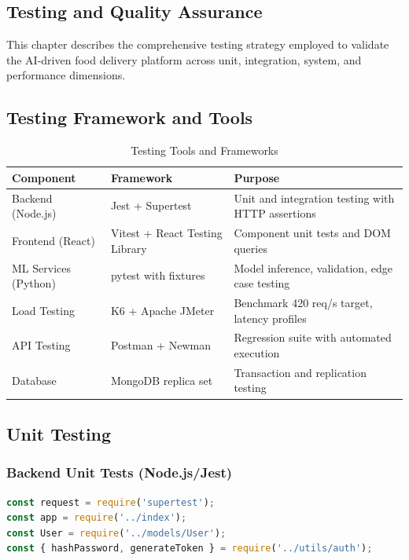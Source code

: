 \documentclass[12pt,a4paper]{report}
\begin{document}
\begin{itemize}
\chapter{Testing and Quality Assurance}

This chapter describes the comprehensive testing strategy employed to validate the AI-driven food delivery platform across unit, integration, system, and performance dimensions.

\section{Testing Framework and Tools}

\begin{table}[H]
\centering
\caption{Testing Tools and Frameworks}
\begin{tabular}{p{3cm} p{2cm} p{4.5cm}}
\toprule
\textbf{Component} & \textbf{Framework} & \textbf{Purpose} \\
\midrule
Backend (Node.js) & Jest + Supertest & Unit and integration testing with HTTP assertions \\
Frontend (React) & Vitest + React Testing Library & Component unit tests and DOM queries \\
ML Services (Python) & pytest with fixtures & Model inference, validation, edge case testing \\
Load Testing & K6 + Apache JMeter & Benchmark 420 req/s target, latency profiles \\
API Testing & Postman + Newman & Regression suite with automated execution \\
Database & MongoDB replica set & Transaction and replication testing \\
\bottomrule
\end{tabular}
\end{table}

\section{Unit Testing}

\subsection{Backend Unit Tests (Node.js/Jest)}

\begin{lstlisting}[language=javascript, caption={User Authentication Unit Tests}]
const request = require('supertest');
const app = require('../index');
const User = require('../models/User');
const { hashPassword, generateToken } = require('../utils/auth');


\end{lstlisting}
\end{itemize}
\end{document}
